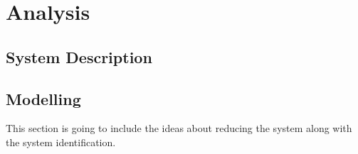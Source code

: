 
\part{Analysis}
\label{Analysis}

\chapter{System Description}
\label{System_description}

 





\chapter{Modelling}
\label{modelling}

This section is going to include the ideas about reducing the system along with the system identification. 





























